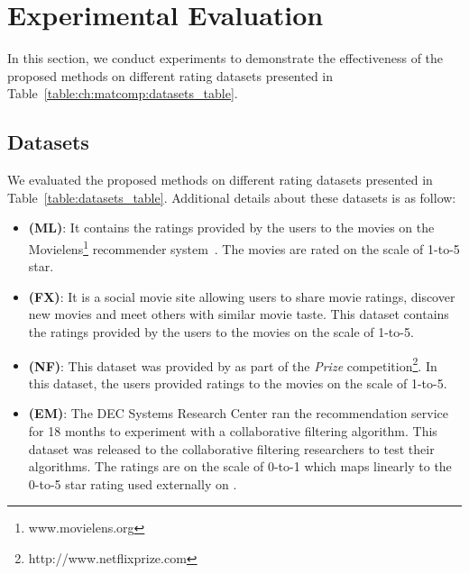 \section{Experimental Evaluation}\label{ch:tmf:exp_eval}
In this section, we conduct experiments to demonstrate the effectiveness of the
proposed methods on different rating datasets presented in Table~\ref{table:ch:matcomp:datasets_table}.


\iffalse
\subsection{Datasets}\label{datasets}
We evaluated the proposed methods on different rating datasets presented in
Table~\ref{table:datasets_table}. Additional details about these datasets is as
follow:

\begin{itemize}
  \item \textbf{\MLTM (ML)}: It
  contains the ratings provided by the users to the movies on the 
  Movielens\footnote{www.movielens.org} recommender system~\cite{konstan03ml}. The movies are rated on the scale
  of 1-to-5 star.
  \item \textbf{\FLIX (FX)}: It is a social movie site allowing users to share
  movie ratings, discover new movies and meet others with similar movie taste.
  This dataset contains the ratings provided by the users to the movies on the
  scale of 1-to-5.
  \item \textbf{\NF (NF)}: This dataset was provided by \NF as part of the \textit{\NF
  Prize} competition\footnote{http://www.netflixprize.com}. In this dataset, the \NF users provided ratings to the
  movies on the scale of 1-to-5.
  \item \textbf{\EM (EM)}: The DEC Systems Research Center ran the \EM
  recommendation service for 18 months to experiment with a collaborative
  filtering algorithm. This dataset was released to the collaborative filtering
  researchers to test their algorithms. The ratings are on the scale of 0-to-1
  which maps linearly to the 0-to-5 star rating used externally on \EM.
\end{itemize}
